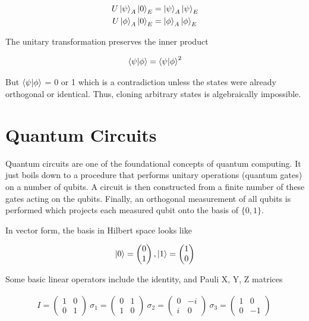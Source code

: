 \documentclass[11pt]{article}
\begin{document}
\begin{align*}
	U\ket{\psi}_A \ket{0}_E & = \ket{\psi}_A \ket{\psi}_E \\
	U\ket{\phi}_A \ket{0}_E & = \ket{\phi}_A \ket{\phi}_E \\
\end{align*}

The unitary transformation preserves the inner product

\begin{equation*}
	\braket{\psi|\phi} = \braket{\psi|\phi}^2
\end{equation*}

But $\braket{\psi|\phi}$ = 0 or 1 which is a contradiction unless the states were already orthogonal or identical. Thus, cloning arbitrary states is algebraically impossible.


\newpage

\section{Quantum Circuits}

Quantum circuits are one of the foundational concepts of quantum computing. It just boils down to a procedure that performs unitary operations (quantum gates) on a number of qubits. A circuit is then constructed from a finite number of these gates acting on the qubits. Finally, an orthogonal measurement of all qubits is performed which projects each measured qubit onto the basis of $\{0, 1 \}$.

In vector form, the basis in Hilbert space looks like

\begin{equation*}
	\ket{0} = \begin{pmatrix}0 \\ 1\end{pmatrix}, \ket{1} = \begin{pmatrix}1 \\ 0\end{pmatrix}
\end{equation*}

Some basic linear operators include the identity, and Pauli X, Y, Z matrices

\begin{align*}
	I = \begin{pmatrix} 1 & 0 \\ 0 & 1 \end{pmatrix} \
	\sigma_1 = \begin{pmatrix} 0 & 1 \\ 1 & 0 \end{pmatrix} \
	\sigma_2 = \begin{pmatrix} 0 & -i  \\ i & 0 \end{pmatrix} \
	\sigma_3 = \begin{pmatrix} 1 & 0 \\ 0 & -1 \end{pmatrix} \
\end{align*}
\end{document}

